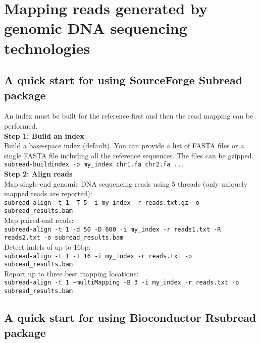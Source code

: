 \documentclass[12pt]{report}
\newcommand{\code}[1]{{\small\texttt{#1}}}
\newcommand{\Subread}{\textsf{Subread}}
\newcommand{\Rsubread}{\textsf{Rsubread}}
\begin{document}
\chapter{Mapping reads generated by genomic DNA sequencing technologies}
\label{chapter:subread-dnaseq}

\section{A quick start for using SourceForge {\Subread} package}

An index must be built for the reference first and then the read mapping can be performed.\\

{\noindent\bf Step 1: Build an index}\\

\noindent Build a base-space index (default). You can provide a list of FASTA files or a single FASTA file including all the reference sequences. The files can be gzipped.\\

\code{subread-buildindex -o my\_index chr1.fa chr2.fa ...}\\

{\noindent\bf Step 2: Align reads}\\

\noindent Map single-end genomic DNA sequencing reads using 5 threads (only uniquely mapped reads are reported):\\
\code{subread-align -t 1 -T 5 -i my\_index -r reads.txt.gz -o subread\_results.bam}\\

\noindent Map paired-end reads:\\
\code{subread-align -t 1 -d 50 -D 600 -i my\_index -r reads1.txt -R reads2.txt \newline -o subread\_results.bam}\\

\noindent Detect indels of up to 16bp:\\
\code{subread-align -t 1 -I 16 -i my\_index -r reads.txt -o subread\_results.bam}\\

\noindent Report up to three best mapping locations:\\
\code{subread-align -t 1 --multiMapping -B 3 -i my\_index -r reads.txt -o subread\_results.bam}\\


\section{A quick start for using Bioconductor {\Rsubread} package}
\end{document}

